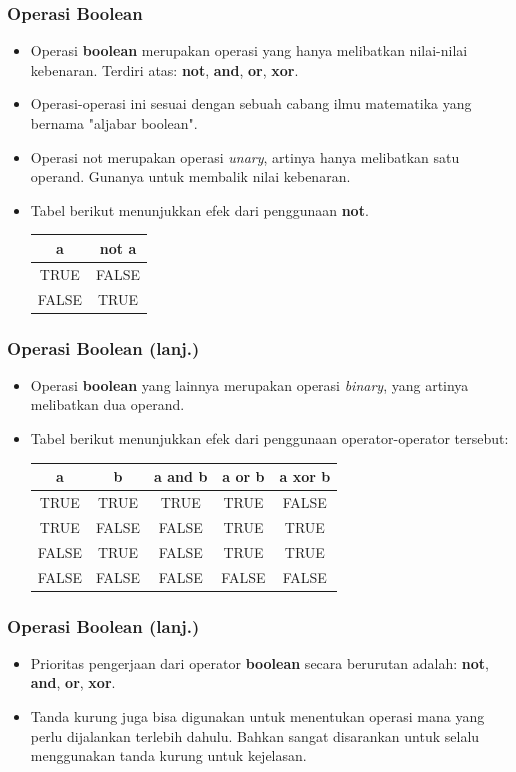 \documentclass{beamer}
\begin{document}
\begin{frame}
\frametitle{Operasi Boolean}
\begin{itemize}
  \item Operasi \textbf{boolean} merupakan operasi yang hanya melibatkan nilai-nilai kebenaran. Terdiri atas: \textbf{not}, \textbf{and}, \textbf{or}, \textbf{xor}.
  \item Operasi-operasi ini sesuai dengan sebuah cabang ilmu matematika yang bernama "aljabar boolean".
  \item Operasi \alert{not} merupakan operasi \textit{unary}, artinya hanya melibatkan satu operand. Gunanya untuk membalik nilai kebenaran.
  \item Tabel berikut menunjukkan efek dari penggunaan \textbf{not}.
  \begin{tabular}{|c|c|}
  \hline a & not a \\
  \hline TRUE & FALSE \\
  \hline FALSE & TRUE \\
  \hline
  \end{tabular}
\end{itemize}
\end{frame}

\begin{frame}
\frametitle{Operasi Boolean (lanj.)}
\begin{itemize}
  \item Operasi \textbf{boolean} yang lainnya merupakan operasi \textit{binary}, yang artinya melibatkan dua operand.
  \item Tabel berikut menunjukkan efek dari penggunaan operator-operator tersebut:
  \begin{tabular}{|c|c|c|c|c|}
  \hline a & b & a and b & a or b & a xor b \\
  \hline TRUE & TRUE & TRUE & TRUE & FALSE \\
  \hline TRUE & FALSE & FALSE & TRUE & TRUE \\
  \hline FALSE & TRUE & FALSE & TRUE & TRUE\\
  \hline FALSE & FALSE & FALSE & FALSE & FALSE \\
  \hline
  \end{tabular}
\end{itemize}
\end{frame}

\begin{frame}
\frametitle{Operasi Boolean (lanj.)}
\begin{itemize}
  \item Prioritas pengerjaan dari operator \textbf{boolean} secara berurutan adalah: \textbf{not}, \textbf{and}, \textbf{or}, \textbf{xor}.
  \item Tanda kurung juga bisa digunakan untuk menentukan operasi mana yang perlu dijalankan terlebih dahulu. Bahkan sangat disarankan untuk selalu menggunakan tanda kurung untuk kejelasan.
\end{itemize}
\end{frame}
\end{document}
